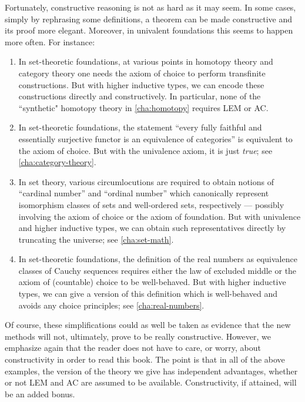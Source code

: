 Fortunately, constructive reasoning is not as hard as it may seem.
In some cases, simply by rephrasing some definitions, a theorem can be made constructive and its proof more elegant.
Moreover, in univalent foundations this seems to happen more often.
For instance:
\begin{enumerate}
\item In set-theoretic foundations, at various points in homotopy theory and category theory one needs the axiom of choice to perform transfinite constructions.
  But with higher inductive types, we can encode these constructions directly and constructively.
  In particular, none of the ``synthetic" homotopy theory in \autoref{cha:homotopy} requires LEM or AC.
\item In set-theoretic foundations, the statement ``every fully faithful and essentially surjective functor is an equivalence of categories'' is equivalent to the axiom of choice.
  But with the univalence axiom, it is just \emph{true}; see \autoref{cha:category-theory}.
\item In set theory, various circumlocutions are required to obtain notions of ``cardinal number'' and ``ordinal number'' which canonically represent isomorphism classes of sets and well-ordered sets, respectively --- possibly involving the axiom of choice or the axiom of foundation.
  But with univalence and higher inductive types, we can obtain such representatives directly by truncating the universe; see \autoref{cha:set-math}.
\item In set-theoretic foundations, the definition of the real numbers as equivalence classes of Cauchy sequences requires either the law of excluded middle or the axiom of (countable) choice to be well-behaved.
  But with higher inductive types, we can give a version of this definition which is well-behaved and avoids any choice principles; see \autoref{cha:real-numbers}.
\end{enumerate}
Of course, these simplifications could as well be taken as evidence that the new methods will not, ultimately, prove to be really constructive.  However, we emphasize again that the reader does not have to care, or worry, about constructivity in order to read this book.  The point is that in all of the above examples, the version of the theory we give has independent advantages, whether or not LEM and AC are assumed to be available.  Constructivity, if attained, will be an added bonus.

